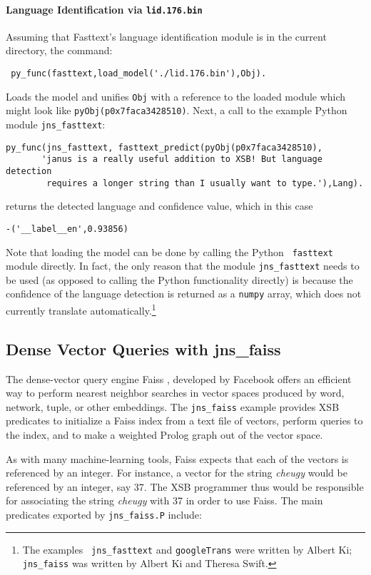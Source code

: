 \paragraph{Language Identification via {\tt lid.176.bin}}
Assuming that Fasttext's language identification module is in the
current directory, the command:
\begin{verbatim}
 py_func(fasttext,load_model('./lid.176.bin'),Obj).
\end{verbatim}
Loads the model and unifies {\tt Obj} with a reference to the loaded
module which might look like {\tt pyObj(p0x7faca3428510)}.  
Next, a call to the example Python module {\tt jns\_fasttext}:
\begin{verbatim}
py_func(jns_fasttext, fasttext_predict(pyObj(p0x7faca3428510),
       'janus is a really useful addition to XSB! But language detection
        requires a longer string than I usually want to type.'),Lang).  
\end{verbatim}
returns the detected language and confidence value, which in this case

\begin{verbatim}
-('__label__en',0.93856)
\end{verbatim}

Note that loading the model can be done by calling the Python {\tt
  fasttext} module directly.  In fact, the only reason that the module
{\tt jns\_fasttext} needs to be used (as opposed to calling the Python
functionality directly) is because the confidence of the language
detection is returned as a {\tt numpy} array, which \janus{} does
not currently translate automatically.\footnote{The examples {\tt
    jns\_fasttext} and {\tt googleTrans} were written by Albert Ki;
  {\tt jns\_faiss} was written by Albert Ki and Theresa Swift.}

\subsection{Dense Vector Queries with jns\_faiss}
The dense-vector query engine Faiss \cite{JDH17}, developed by
Facebook offers an efficient way to perform nearest neighbor searches
in vector spaces produced by word, network, tuple, or other
embeddings.  The {\tt jns\_faiss} example provides XSB predicates to
initialize a Faiss index from a text file of vectors, perform queries
to the index, and to make a weighted Prolog graph out of the vector
space.  

As with many machine-learning tools, Faiss expects that each of the
vectors is referenced by an integer.  For instance, a vector for the
string {\em cheugy} would be referenced by an integer, say 37.  The
XSB programmer thus would be responsible for associating the string
{\em cheugy} with 37 in order to use Faiss.  The main predicates
exported by {\tt jns\_faiss.P} include:


